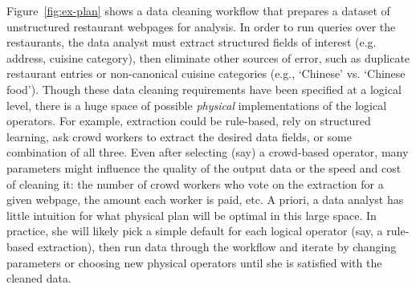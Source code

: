 Figure~\ref{fig:ex-plan} shows a data cleaning workflow that prepares a dataset of unstructured restaurant webpages for analysis.
In order to run queries over the restaurants, the data analyst must extract structured fields of interest (e.g. address, cuisine category), then eliminate other sources of error, such as duplicate restaurant entries or non-canonical cuisine categories (e.g., `Chinese' vs. `Chinese food'). 
Though these data cleaning requirements have been specified at a logical level, there is a huge space of possible \textit{physical} implementations of the logical operators. 
For example, extraction could be rule-based, rely on structured learning, ask crowd workers to extract the desired data fields, or some combination of all three.
Even after selecting (say) a crowd-based operator, many parameters might influence the quality of the output data or the speed and cost of cleaning it: the number of crowd workers who vote on the extraction for a given webpage, the amount each worker is paid, etc.
A priori, a data analyst has little intuition for what physical plan will be optimal in this large space. 
In practice, she will likely pick a simple default for each logical operator (say, a rule-based extraction), then run data through the workflow and iterate by changing parameters or choosing new physical operators until she is satisfied with the cleaned data.



